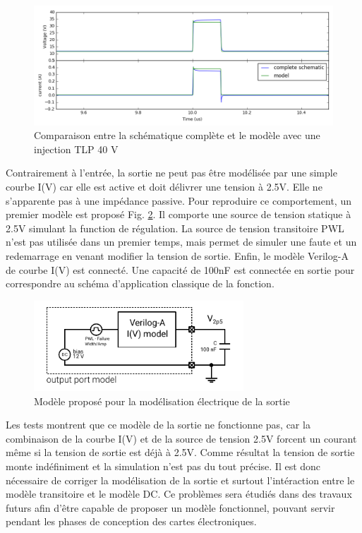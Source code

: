 \begin{figure}[!h]
  \centering
  \includegraphics[width=\textwidth]{src/1/figures/comparison_model_total_40V.png}
  \caption{Comparaison entre la schématique complète et le modèle avec une injection TLP 40 V}
  \label{fig:compare-model-simu-m10}
\end{figure}

Contrairement à l'entrée, la sortie ne peut pas être modélisée par une simple courbe I(V) car elle est active et doit délivrer une tension à 2.5V.
Elle ne s'apparente pas à une impédance passive.
Pour reproduire ce comportement, un premier modèle est proposé Fig. \ref{fig:first-output-model}.
Il comporte une source de tension statique à 2.5V simulant la function de régulation.
La source de tension transitoire PWL n'est pas utilisée dans un premier temps, mais permet de simuler une faute et un redemarrage en venant modifier la tension de sortie.
Enfin, le modèle Verilog-A de courbe I(V) est connecté.
Une capacité de 100nF est connectée en sortie pour correspondre au schéma d'application classique de la fonction.

\begin{figure}[!h]
  \centering
  \includegraphics[width=0.7\textwidth]{src/1/figures/first_output_model.pdf}
  \caption{Modèle proposé pour la modélisation électrique de la sortie}
  \label{fig:first-output-model}
\end{figure}

Les tests montrent que ce modèle de la sortie ne fonctionne pas, car la combinaison de la courbe I(V) et de la source de tension 2.5V forcent un courant même si la tension de sortie est déjà à 2.5V.
Comme résultat la tension de sortie monte indéfiniment et la simulation n'est pas du tout précise.
Il est donc nécessaire de corriger la modélisation de la sortie et surtout l'intéraction entre le modèle transitoire et le modèle DC.
Ce problèmes sera étudiés dans des travaux futurs afin d'être capable de proposer un modèle fonctionnel, pouvant servir pendant les phases de conception des cartes électroniques.

